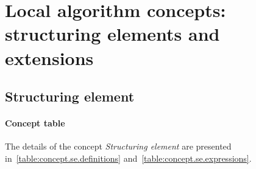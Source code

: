 \clearpage

\section{Local algorithm concepts: structuring elements and extensions}


\subsection{Structuring element}

\paragraph{Concept table}

The details of the concept \emph{Structuring element} are presented in~\cref{table:concept.se.definitions}
and~\cref{table:concept.se.expressions}.

